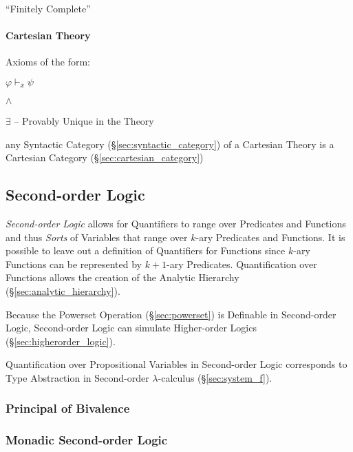 ``Finitely Complete''



\paragraph{Cartesian Theory}\label{sec:cartesian_theory}\hfill

Axioms of the form:

$\varphi \vdash_{\overline{x}} \psi$

$\wedge$

$\exists$ -- Provably Unique in the Theory

any Syntactic Category (\S\ref{sec:syntactic_category}) of a Cartesian
Theory is a Cartesian Category (\S\ref{sec:cartesian_category})



\subsection{Second-order Logic}\label{sec:secondorder_logic}

\emph{Second-order Logic} allows for Quantifiers to range over
Predicates and Functions and thus \emph{Sorts} of Variables that range
over $k$-ary Predicates and Functions. It is possible to leave out a
definition of Quantifiers for Functions since $k$-ary Functions can be
represented by $k+1$-ary Predicates.\cite{shapiro00} Quantification
over Functions allows the creation of the Analytic Hierarchy
(\S\ref{sec:analytic_hierarchy}).

Because the Powerset Operation (\S\ref{sec:powerset}) is Definable in
Second-order Logic, Second-order Logic can simulate Higher-order
Logics (\S\ref{sec:higherorder_logic}).

Quantification over Propositional Variables in Second-order Logic
corresponds to Type Abstraction in Second-order $\lambda$-calculus
(\S\ref{sec:system_f}).



\subsubsection{Principal of Bivalence}\label{sec:bivalence_principal}

\subsubsection{Monadic Second-order Logic}\label{sec:monadic_secondorder}

